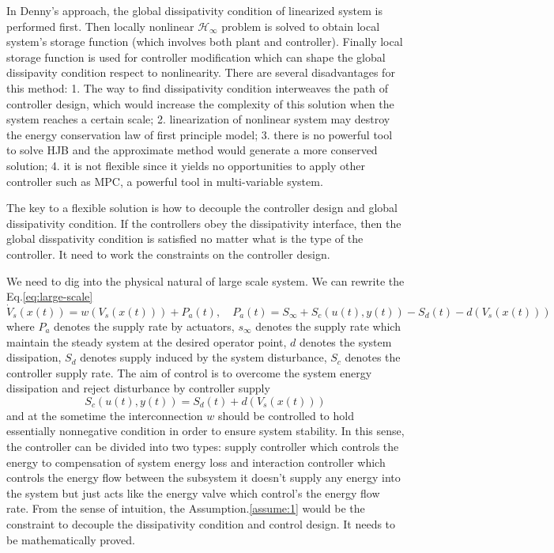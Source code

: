 \documentclass{paper}
\begin{document}
In Denny's approach, the global dissipativity condition of linearized system is performed first. Then locally nonlinear
$\mathcal{H}_\infty$ problem is solved to obtain local system's storage function (which involves both plant and controller).
Finally local storage function is used for controller modification which can shape the global dissipavity condition respect 
to nonlinearity. There are several disadvantages for this method: 1. The way to find dissipativity condition interweaves the 
path of controller design, which would increase the complexity of this solution when the system reaches a certain scale; 
2. linearization of nonlinear system may destroy the energy conservation law of first principle model; 3. there is no powerful 
tool to solve HJB and the approximate method would generate a more conserved solution; 4. it is not flexible since it yields no 
opportunities to apply other controller such as MPC, a powerful tool in multi-variable system.

The key to a flexible solution is how to decouple the controller design and global dissipativity condition. If the controllers
obey the dissipativity interface, then the global disspativity condition is satisfied no matter what is the type of the controller.
It need to work the constraints on the controller design.

We need to dig into the physical natural of large scale system. We can rewrite the Eq.\ref{eq:large-scale}
\begin{equation}
\dot{V}_s(x(t))=w(V_s(x(t)))+P_a(t),\quad P_a(t)=S_\infty+S_c(u(t),y(t))-S_d(t)-d(V_s(x(t)))
\end{equation}
where $P_a$ denotes the supply rate by actuators, $s_\infty$ denotes the supply rate which maintain the steady system at the desired
operator point, $d$ denotes the system dissipation, $S_d$ denotes supply induced by the system disturbance, $S_c$ denotes the controller
supply rate. The aim of control is to overcome the system energy dissipation and reject disturbance by controller supply
\begin{equation}
S_c(u(t),y(t))=S_d(t)+d(V_s(x(t)))
\end{equation}
and at the sometime the interconnection $w$ should be controlled to hold essentially nonnegative condition in order to ensure system stability. 
In this sense, the controller can be divided into two types: supply controller which controls the energy to compensation of system energy loss 
and interaction controller which controls the energy flow between the subsystem it doesn't supply any energy into the system but just acts like
the energy valve which control's the energy flow rate. From the sense of intuition, the Assumption.\ref{assume:1} would be the constraint to
decouple the dissipativity condition and control design. It needs to be mathematically proved. 
  
\end{document}
